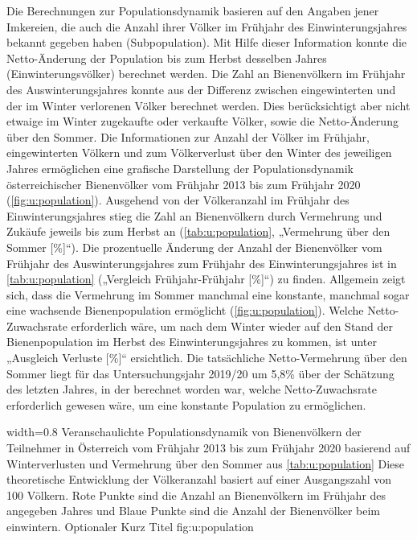 Die Berechnungen zur Populationsdynamik basieren auf den Angaben jener Imkereien, die auch die Anzahl ihrer Völker im Frühjahr des Einwinterungsjahres bekannt gegeben haben (Subpopulation). Mit Hilfe dieser Information konnte die Netto-Änderung der Population bis zum Herbst desselben Jahres (Einwinterungsvölker) berechnet werden. Die Zahl an Bienenvölkern im Frühjahr des Auswinterungsjahres konnte aus der Differenz zwischen eingewinterten und der im Winter verlorenen Völker berechnet werden. Dies berücksichtigt aber nicht etwaige im Winter zugekaufte oder verkaufte Völker, sowie die Netto-Änderung über den Sommer. Die Informationen zur Anzahl der Völker im Frühjahr, eingewinterten Völkern und zum Völkerverlust über den Winter des jeweiligen Jahres ermöglichen eine grafische Darstellung der Populationsdynamik österreichischer Bienenvölker vom Frühjahr 2013 bis zum Frühjahr 2020 (\cref{fig:u:population}).
\newline
Ausgehend von der Völkeranzahl im Frühjahr des Einwinterungsjahres stieg die Zahl an Bienenvölkern durch Vermehrung und Zukäufe jeweils bis zum Herbst an (\cref{tab:u:population}, „Vermehrung über den Sommer [\%]``). Die prozentuelle Änderung der Anzahl der Bienenvölker vom Frühjahr des Auswinterungsjahres zum Frühjahr des Einwinterungsjahres ist in \cref{tab:u:population} („Vergleich Frühjahr-Frühjahr [\%]``) zu finden. Allgemein zeigt sich, dass die Vermehrung im Sommer manchmal eine konstante, manchmal sogar eine wachsende Bienenpopulation ermöglicht (\cref{fig:u:population}). Welche Netto-Zuwachsrate erforderlich wäre, um nach dem Winter wieder auf den Stand der Bienenpopulation im Herbst des Einwinterungsjahres zu kommen, ist unter „Ausgleich Verluste [\%]`` ersichtlich. 
\newline
Die tatsächliche Netto-Vermehrung über den Sommer liegt für das Untersuchungsjahr 2019/20 um 5,8\% über der Schätzung des letzten Jahres, in der berechnet worden war, welche Netto-Zuwachsrate erforderlich gewesen wäre, um eine konstante Population zu ermöglichen.



  {width=0.8\textwidth} %
  {Veranschaulichte Populationsdynamik von Bienenvölkern der Teilnehmer in Österreich vom Frühjahr 2013 bis zum Frühjahr 2020 basierend auf Winterverlusten und Vermehrung über den Sommer aus \cref{tab:u:population} Diese theoretische Entwicklung der Völkeranzahl basiert auf einer Ausgangszahl von 100 Völkern. Rote Punkte sind die Anzahl an Bienenvölkern im Frühjahr des angegeben Jahres und Blaue Punkte sind die Anzahl der Bienenvölker beim einwintern.} %
  {Optionaler Kurz Titel} %
  {fig:u:population} %

